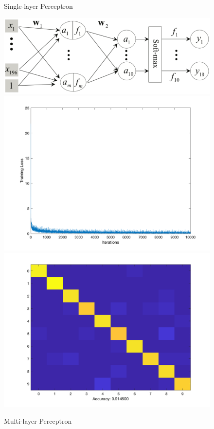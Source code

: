 \documentclass[letter, 10pt]{article}
\begin{document}
\begin{figure}[H]
    \endminipage\hfill
    \caption{Single-layer Perceptron}
\end{figure}

\begin{figure}[H]
        \centering
        \includegraphics[width=\textwidth]{HW4/RESULT/MLP.png}
    \endminipage\hfill
        \centering
        \includegraphics[width=1.1\textwidth]{HW4/RESULT/MLP_loss.png}
    \endminipage\hfill
        \centering
        \includegraphics[width=1.1\textwidth]{HW4/RESULT/MLP_CONFUSION.png}
    \endminipage\hfill
    \caption{Multi-layer Perceptron}
\end{figure}
\end{document}
